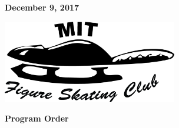 \documentclass[12pt]{article}
\newcommand{\programnumber}[2]{{
  \vspace{0.1in}
  \textbf{#1}\\
  {\footnotesize #2}
}}
\begin{document}
\begin{multicols*}{2}
\begin{center}
\vspace{0.2in}

{\large\textbf{December 9, 2017}}

\vspace{0.7in}

\includegraphics[width=3in]{fsclogo.png}

\end{center}

\vfill\null
\columnbreak


\begin{center}

{\large \textbf{Program Order}}



\end{center}
\end{multicols*}
\end{document}
